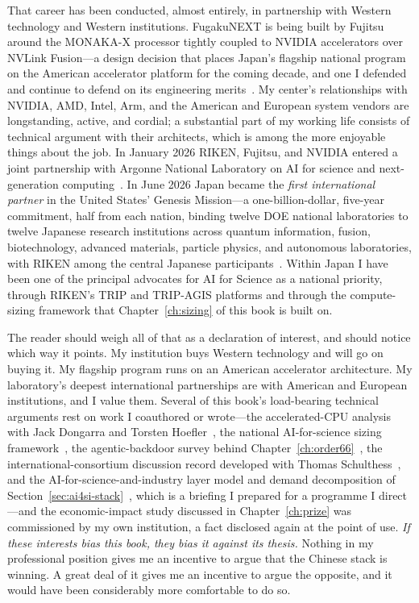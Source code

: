 \documentclass[11pt,a4paper,oneside]{book}
\begin{document}
That career has been conducted, almost entirely, in partnership with Western technology and Western institutions. FugakuNEXT is being built by Fujitsu around the MONAKA-X processor tightly coupled to NVIDIA accelerators over NVLink Fusion---a design decision that places Japan's flagship national program on the American accelerator platform for the coming decade, and one I defended and continue to defend on its engineering merits~\cite{fugakunext}. My center's relationships with NVIDIA, AMD, Intel, Arm, and the American and European system vendors are longstanding, active, and cordial; a substantial part of my working life consists of technical argument with their architects, which is among the more enjoyable things about the job. In January 2026 RIKEN, Fujitsu, and NVIDIA entered a joint partnership with Argonne National Laboratory on AI for science and next-generation computing~\cite{anl-riken}. In June 2026 Japan became the \emph{first international partner} in the United States' Genesis Mission---a one-billion-dollar, five-year commitment, half from each nation, binding twelve DOE national laboratories to twelve Japanese research institutions across quantum information, fusion, biotechnology, advanced materials, particle physics, and autonomous laboratories, with RIKEN among the central Japanese participants~\cite{genesis-japan}. Within Japan I have been one of the principal advocates for AI for Science as a national priority, through RIKEN's TRIP and TRIP-AGIS platforms and through the compute-sizing framework that Chapter~\ref{ch:sizing} of this book is built on.

The reader should weigh all of that as a declaration of interest, and should notice which way it points. My institution buys Western technology and will go on buying it. My flagship program runs on an American accelerator architecture. My laboratory's deepest international partnerships are with American and European institutions, and I value them. Several of this book's load-bearing technical arguments rest on work I coauthored or wrote---the accelerated-CPU analysis with Jack Dongarra and Torsten Hoefler~\cite{dhm-cacm,dhm-long}, the national AI-for-science sizing framework~\cite{ai4s-framework}, the agentic-backdoor survey behind Chapter~\ref{ch:order66}~\cite{order66}, the international-consortium discussion record developed with Thomas Schulthess~\cite{consortium-record}, and the AI-for-science-and-industry layer model and demand decomposition of Section~\ref{sec:ai4si-stack}~\cite{ai4si-stack}, which is a briefing I prepared for a programme I direct---and the economic-impact study discussed in Chapter~\ref{ch:prize} was commissioned by my own institution, a fact disclosed again at the point of use. \emph{If these interests bias this book, they bias it against its thesis.} Nothing in my professional position gives me an incentive to argue that the Chinese stack is winning. A great deal of it gives me an incentive to argue the opposite, and it would have been considerably more comfortable to do so.
\end{document}
